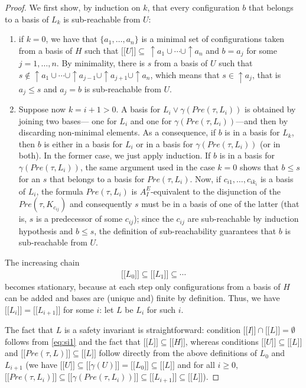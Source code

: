 \documentclass{LMCS}
\newcommand{\mywidehat}[1]{\ensuremath{\lbrack\!\lbrack #1 \rbrack\!\rbrack}}
\theoremstyle{plain}\newtheorem{assumption}[thm]{Assumption}
\theoremstyle{plain}\newtheorem{proposition}[thm]{Proposition}
\theoremstyle{plain}\newtheorem{property}[thm]{Property}
\theoremstyle{plain}\newtheorem{example}[thm]{Example}
\theoremstyle{plain}\newtheorem{claim}[thm]{Claim}
\theoremstyle{plain}\newtheorem{lemma}[thm]{Lemma}
\begin{document}
\begin{proof}
  We first show, by induction on $k$, that every configuration $b$
  that belongs to a basis of ${L_k}$ is sub-reachable from $U$:
  \begin{enumerate}[$\bullet$]
  \item if $k=0$, we have that $\{a_1, \dots, a_n\}$ is a minimal set
    of configurations taken from a basis of $H$ such that
    $\mywidehat{U}\subseteq\,\uparrow\! a_1\cup \cdots \cup \uparrow\!
    a_n$ and $b=a_j$ for some $j=1, \dots, n$. By minimality, there is
    $s$ from a basis of $U$ such that $s\not \in \uparrow \! a_1\cup
    \cdots\cup \uparrow\! a_{j-1}\cup \uparrow\! a_{j+1} \cup
    \uparrow\!  a_n$, which means that $s\in \uparrow\!a_j$, that is
    $a_j\leq s$ and $a_j=b$ is sub-reachable from $U$.
  \item Suppose now $k=i+1>0$.  A basis for $L_i\vee \gamma(Pre(\tau,
    L_i))$ is obtained by joining two bases--- one for $L_i$ and one
    for $\gamma(Pre(\tau, L_i))$---and then by discarding non-minimal
    elements.  As a consequence, if $b$ is in a basis for $L_k$, then
    $b$ is either in a basis for $L_i$ or in a basis for
    $\gamma(Pre(\tau, L_i))$ (or in both). In the former case, we just
    apply induction.  If $b$ is in a basis for $\gamma(Pre(\tau,
    L_i))$, the same argument used in the case $k=0$ shows that $b\leq
    s$ for an $s$ that belongs to a basis for $Pre(\tau, L_i)$.  Now,
    if $c_{i1},\dots, c_{ik_i}$ is a basis of $L_i$, the formula
    $Pre(\tau, L_i)$ is $A^E_I$-equivalent to the disjunction of the
    $Pre(\tau, K_{c_{ij}})$ and consequently $s$ must be in a basis of
    one of the latter (that is, $s$ is a predecessor of some
    $c_{ij}$); since the $c_{ij}$ are sub-reachable by induction
    hypothesis and $b\leq s$, the definition of sub-reachability
    guarantees that $b$ is sub-reachable from $U$.
  \end{enumerate}
  The increasing chain
  \begin{eqnarray*}
    \mywidehat{L_0}\subseteq \mywidehat{L_1}\subseteq \cdots
  \end{eqnarray*}
  becomes stationary, because at each step only configurations from a
  basis of ${H}$ can be added and bases are (unique and) finite by
  definition.  Thus, we have $\mywidehat{L_i}=\mywidehat{L_{i+1}}$ for
  some $i$: let $L$ be $L_i$ for such $i$.

  The fact that $L$ is a safety invariant is straightforward:
  condition $\mywidehat{I} \cap \mywidehat{L} =\emptyset$ follows from
  \eqref{eq:si1} and the fact that $\mywidehat{L}\subseteq
  \mywidehat{H}$, whereas conditions $\mywidehat{U}\subseteq
  \mywidehat{L}$ and $\mywidehat{Pre(\tau, L)}\subseteq \mywidehat{L}$
  follow directly from the above definitions of $L_0$ and $L_{i+1}$
  (we have $\mywidehat{U}\subseteq \mywidehat{\gamma(U)}=
  \mywidehat{L_0}\subseteq \mywidehat{L}$ and for all $i\geq 0$,
  $\mywidehat{Pre(\tau, L_i)}\subseteq \mywidehat{\gamma(Pre(\tau,
    L_i))}\subseteq \mywidehat{L_{i+1}}\subseteq \mywidehat{L}$).
\end{proof}
\end{document}

